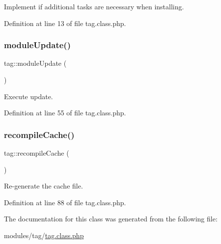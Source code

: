 Implement if additional tasks are necessary when installing. 



Definition at line 13 of file tag.\+class.\+php.

\hypertarget{classtag_a4ebfee9c57c877da29b92821b3716060}{}\label{classtag_a4ebfee9c57c877da29b92821b3716060} 
\subsubsection{\texorpdfstring{module\+Update()}{moduleUpdate()}}
{\footnotesize\ttfamily tag\+::module\+Update (\begin{DoxyParamCaption}{ }\end{DoxyParamCaption})}



Execute update. 



Definition at line 55 of file tag.\+class.\+php.

\hypertarget{classtag_a5776ef44ff2110b18834d6b4ad9b9d2d}{}\label{classtag_a5776ef44ff2110b18834d6b4ad9b9d2d} 
\subsubsection{\texorpdfstring{recompile\+Cache()}{recompileCache()}}
{\footnotesize\ttfamily tag\+::recompile\+Cache (\begin{DoxyParamCaption}{ }\end{DoxyParamCaption})}



Re-\/generate the cache file. 



Definition at line 88 of file tag.\+class.\+php.



The documentation for this class was generated from the following file\+:\begin{DoxyCompactItemize}
\item 
modules/tag/\hyperlink{tag_8class_8php}{tag.\+class.\+php}\end{DoxyCompactItemize}
